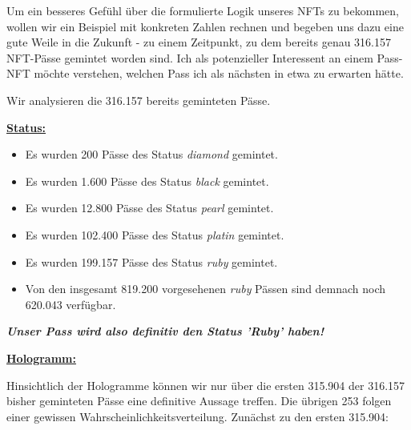 
Um ein besseres Gefühl über die formulierte Logik unseres NFTs zu bekommen, wollen wir ein Beispiel mit konkreten Zahlen rechnen und begeben uns dazu eine gute Weile in die Zukunft - zu einem Zeitpunkt, zu dem bereits genau 316.157 NFT-Pässe gemintet worden sind. Ich als potenzieller Interessent an einem Pass-NFT möchte verstehen, welchen Pass ich als nächsten in etwa zu erwarten hätte.

\vspace{0.2cm} 

Wir analysieren die 316.157 bereits geminteten Pässe.

\vspace{0.5cm} 

\underline{\textbf{Status:}}

\begin{itemize}
  \item Es wurden 200 Pässe des Status \textit{diamond} gemintet.
  \item Es wurden 1.600 Pässe des Status \textit{black} gemintet.
  \item Es wurden 12.800 Pässe des Status \textit{pearl} gemintet.
  \item Es wurden 102.400 Pässe des Status \textit{platin} gemintet.
  \item Es wurden 199.157 Pässe des Status \textit{ruby} gemintet.
  \item Von den insgesamt 819.200 vorgesehenen \textit{ruby} Pässen sind demnach noch 620.043 verfügbar.
\end{itemize}

\vspace{0.2cm}

\textit{\textbf{Unser Pass wird also definitiv den Status 'Ruby' haben!}}

\vspace{1.0cm}


\underline{\textbf{Hologramm:}}

\vspace{0.2cm}

Hinsichtlich der Hologramme können wir nur über die ersten 315.904 der 316.157 bisher geminteten Pässe eine definitive Aussage treffen. Die übrigen 253 folgen einer gewissen Wahrscheinlichkeitsverteilung. Zunächst zu den ersten 315.904:

